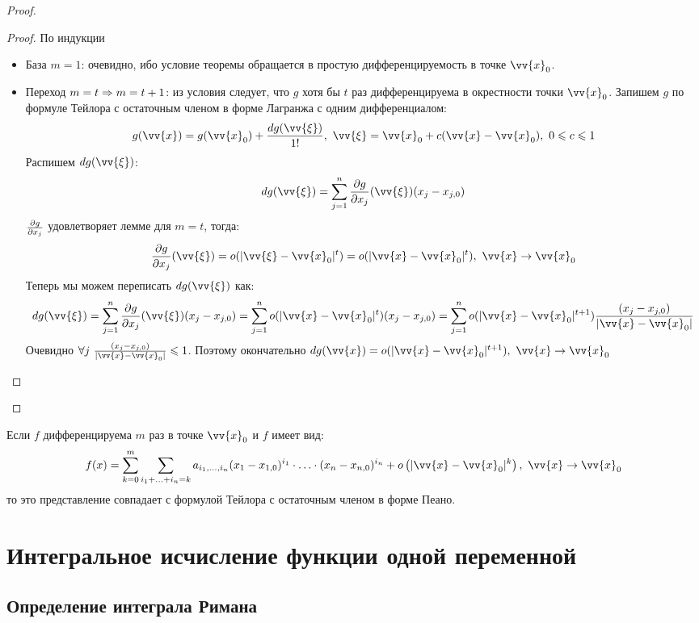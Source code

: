 \begin{proof}
	\begin{proof}
		По индукции
		\begin{itemize}
			\item База $m = 1$: очевидно, ибо условие теоремы обращается в простую дифференцируемость в точке $\vv{x}_0$.
			
			\item Переход $m = t \Rightarrow m = t + 1$: из условия следует, что $g$ хотя бы $t$ раз дифференцируема в окрестности точки $\vv{x}_0$. Запишем $g$ по формуле Тейлора с остаточным членом в форме Лагранжа с одним дифференциалом:
			\[
				g(\vv{x}) = g(\vv{x}_0) + \frac{dg(\vv{\xi})}{1!},\ \vv{\xi} = \vv{x}_0 + c(\vv{x} - \vv{x}_0),\ 0 \le c \le 1
			\]
			Распишем $dg(\vv{\xi})$:
			\[
				dg(\vv{\xi}) = \suml_{j = 1}^n \pd{g}{x_j} (\vv{\xi}) (x_j - x_{j, 0})
			\]
			$\frac{\partial g}{\partial x_j}$ удовлетворяет лемме для $m = t$, тогда:
			\[
				\pd{g}{x_j}(\vv{\xi}) = o(|\vv{\xi} - \vv{x}_0|^t) = o(|\vv{x} - \vv{x}_0|^t),\ \vv{x} \to \vv{x}_0
			\]
			Теперь мы можем переписать $dg(\vv{\xi})$ как:
			\[
				dg(\vv{\xi}) = \suml_{j = 1}^n \pd{g}{x_j}(\vv{\xi})(x_j - x_{j, 0}) = \suml_{j = 1}^n o(|\vv{x} - \vv{x}_0|^t)(x_j - x_{j, 0}) = \suml_{j = 1}^n o(|\vv{x} - \vv{x}_0|^{t + 1})\frac{(x_j - x_{j, 0})}{|\vv{x} - \vv{x}_0|}
			\]
			Очевидно $\forall j\ \frac{(x_j - x_{j, 0})}{|\vv{x} - \vv{x}_0|} \leq 1$. Поэтому окончательно $dg(\vv{x}) = o(|\vv{x} - \vv{x}_0|^{t + 1}),\ \vv{x} \to \vv{x}_0$
		\end{itemize}
	\end{proof}
\end{proof}

\begin{note}
	Если $f$ дифференцируема $m$ раз в точке $\vv{x}_0$ и $f$ имеет вид:
	\[
		f(x) = \suml_{k = 0}^m \suml_{i_1 + \ldots + i_n = k} a_{i_1, \ldots, i_n} (x_1 - x_{1, 0})^{i_1} \cdot \ldots \cdot (x_n - x_{n, 0})^{i_n} + o\left(|\vv{x} - \vv{x}_0|^k\right),\ \vv{x} \to \vv{x}_0
	\]
	то это представление совпадает с формулой Тейлора с остаточным членом в форме Пеано.
\end{note}

\section{Интегральное исчисление функции одной переменной}

\subsection{Определение интеграла Римана}

